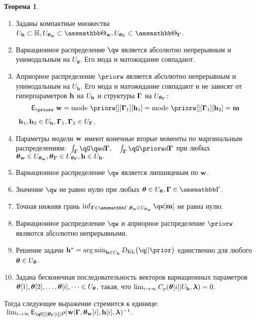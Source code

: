 \documentclass[11pt, a5paper]{dissert}
\theoremstyle{definition}
\newtheorem{theorem}{Теорема}
\DeclareMathOperator*{\argmin}{arg\,min}
\begin{document}
{\begin{theorem}
\begin{enumerate}
\item Заданы компактные множества $\Uh \subset \Hb, \Utetaw \subset \Tetawb, \UtetaG \subset \TetaGb$.

\item Вариационное распределение $\qw$  является абсолютно непрерывным и унимодальным на  $U_{\boldsymbol{\theta}}$.
Его мода и матожидание совпадают.




\item Априорное распределение $\priorw$ является абсолютно непрерывным и унимодальным на  $U_\mathbf{h}$. Его мода и матожидание совпадают и не зависят от гиперпараметров $\mathbf{h}$  на $U_{\mathbf{h}}$ и структуры $\boldsymbol{\Gamma}$ на $U_{\boldsymbol{\theta}_{\boldsymbol{\Gamma}}}$:
\[
\E_{\priorw}~\w = \text{mode}~\priorw[][\G_1][\h_1]=\text{mode}~\priorw[][\G_1][\h_2]=\mathbf{m}
\]
$~\mathbf{h}_1,\mathbf{h}_2 \in U_{\mathbf{h}}, \boldsymbol{\Gamma}_1,\boldsymbol{\Gamma}_2 \in U_{\boldsymbol{\Gamma}}$.


\item Параметры модели $\mathbf{w}$ имеют конечные вторые моменты по маргинальным распределениям:
$
   \int_{\G}\qG\qw d\G, \quad \int_{\G}\qG\priorw d\G
$
при любых $\boldsymbol{\theta}_\mathbf{w} \in U_{\boldsymbol{\theta}_\mathbf{w}}, \boldsymbol{\theta}_{\boldsymbol{\Gamma}} \in U_{\boldsymbol{\theta}_{\boldsymbol{\Gamma}}}, \mathbf{h} \in U_{\mathbf{h}}.$


\item Вариационное распределение $\qw$ является липшицевым по $\mathbf{w}$.

\item Значение $\qw$ не равно нулю при любых $\teta \in \Uteta, \G \in \Gb$.

\item Точная нижняя грань $\inf_{\G \in \Gb, \tetaw \in \Utetaw} \qw[\mathbf{m}]$ не равна нулю.

\item Вариационное распределение $\qw$ и априорное распределение $\priorw$  являются абсолютно непрерывными.

\item Решение задачи $
\h^{*} = \argmin_{\h \in \Uh} \KL{\q}{\prior}$ единственно для любого $\boldsymbol{\theta} \in U_{\boldsymbol{\theta}}$.



\item Задана  бесконечная последовательность векторов вариационных параметров $\boldsymbol{\theta}[1],\boldsymbol{\theta}[2],\dots,\boldsymbol{\theta}[i],\dots \in U_{\boldsymbol{\theta}}$, такая, что $\lim_{i \to \infty}C_p(\boldsymbol{\theta}[i]|U_{\mathbf{h}},\boldsymbol{\lambda}) = 0.$
\end{enumerate}
Тогда следующее выражение стремится к единице:
$
   \lim_{i \to \infty} \E_{\qG[][{\tetaG[i]}]} {\rho}(\w|\G, {\tetaw[i]}, {\h[i]}, \lam)^{-1}.
$

\end{theorem}

}
\end{document}
